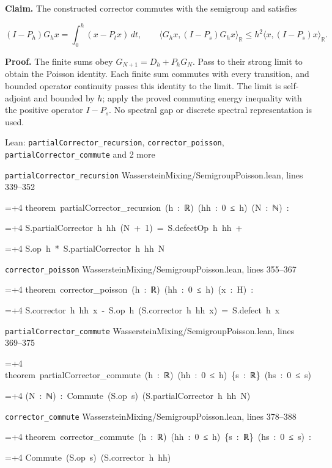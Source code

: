 \documentclass[11pt,a4paper]{article}
\newlength{\leancharwidth}
\newenvironment{leancode}{\par\smallskip\begingroup\ttfamily\footnotesize\raggedright
  \settowidth{\leancharwidth}{M}\setlength{\parskip}{0pt}\setlength{\parindent}{0pt}
  \frenchspacing}{\par\endgroup\smallskip}
\newcommand{\leanline}[2]{\hangindent=\dimexpr#1\leancharwidth+4\leancharwidth\relax
  \hangafter=1\noindent\hspace*{#1\leancharwidth}#2\par}
\newcommand{\leansource}[1]{\par{\footnotesize\color{leanmuted}#1}\par}
\begin{document}
\textbf{Claim.} The constructed corrector commutes with the semigroup and satisfies

\[(I-P_h)G_hx=\int_0^h(x-P_tx)\,dt,\qquad \langle G_hx,(I-P_s)G_hx\rangle_{\mathbb R}\le h^2\langle x,(I-P_s)x\rangle_{\mathbb R}.\]

\textbf{Proof.} The finite sums obey \(G_{N+1}=D_h+P_hG_N\). Pass to their strong limit to obtain the Poisson identity. Each finite sum commutes with every transition, and bounded operator continuity passes this identity to the limit. The limit is self-adjoint and bounded by \(h\); apply the proved commuting energy inequality with the positive operator \(I-P_s\). No spectral gap or discrete spectral representation is used.

\begin{leanbox}{Lean: \texttt{partialCorrector\_\allowbreak{}recursion}, \texttt{corrector\_\allowbreak{}poisson}, \texttt{partialCorrector\_\allowbreak{}commute} and 2 more}
\leansource{\texttt{partialCorrector\_\allowbreak{}recursion} \quad WassersteinMixing/\allowbreak{}SemigroupPoisson.lean, lines 339–352}
\begin{leancode}
\leanline{0}{theorem\ partialCorrector\_recursion\ (h\ :\ ℝ)\ (hh\ :\ 0\ ≤\ h)\ (N\ :\ ℕ)\ :}
\leanline{4}{S.partialCorrector\ h\ hh\ (N\ +\ 1)\ =\ S.defectOp\ h\ hh\ +}
\leanline{6}{S.op\ h\ *\ S.partialCorrector\ h\ hh\ N}
\end{leancode}
\leansource{\texttt{corrector\_\allowbreak{}poisson} \quad WassersteinMixing/\allowbreak{}SemigroupPoisson.lean, lines 355–367}
\begin{leancode}
\leanline{0}{theorem\ corrector\_poisson\ (h\ :\ ℝ)\ (hh\ :\ 0\ ≤\ h)\ (x\ :\ H)\ :}
\leanline{4}{S.corrector\ h\ hh\ x\ -\ S.op\ h\ (S.corrector\ h\ hh\ x)\ =\ S.defect\ h\ x}
\end{leancode}
\leansource{\texttt{partialCorrector\_\allowbreak{}commute} \quad WassersteinMixing/\allowbreak{}SemigroupPoisson.lean, lines 369–375}
\begin{leancode}
\leanline{0}{theorem\ partialCorrector\_commute\ (h\ :\ ℝ)\ (hh\ :\ 0\ ≤\ h)\ \{s\ :\ ℝ\}\ (hs\ :\ 0\ ≤\ s)}
\leanline{4}{(N\ :\ ℕ)\ :\ Commute\ (S.op\ s)\ (S.partialCorrector\ h\ hh\ N)}
\end{leancode}
\leansource{\texttt{corrector\_\allowbreak{}commute} \quad WassersteinMixing/\allowbreak{}SemigroupPoisson.lean, lines 378–388}
\begin{leancode}
\leanline{0}{theorem\ corrector\_commute\ (h\ :\ ℝ)\ (hh\ :\ 0\ ≤\ h)\ \{s\ :\ ℝ\}\ (hs\ :\ 0\ ≤\ s)\ :}
\leanline{4}{Commute\ (S.op\ s)\ (S.corrector\ h\ hh)}

\end{leancode}
\end{leanbox}
\end{document}
